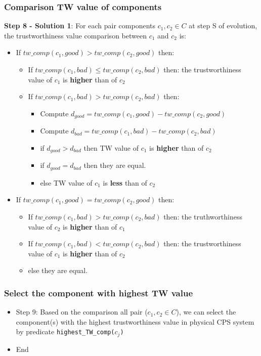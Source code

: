 \documentclass{beamer}
\begin{document}
\begin{frame}[fragile]
	\frametitle{Comparison TW value of components}
		{\bf Step 8 - Solution 1}: For each pair components $c_1, c_2 \in C$ at step S of evolution, the trustworthiness value comparison between $c_1$ and $c_2$ is:
		\begin{itemize}
			\item If $tw\_comp(c_1,good) > tw\_comp(c_2,good)$ then:
			\begin{itemize}
				\item If $tw\_comp(c_1,bad) \leq tw\_comp(c_2,bad)$ then: the trustworthiness value of $c_1$ is {\bf higher} than of $c_2$
				\item If $tw\_comp(c_1,bad) > tw\_comp(c_2,bad)$ then:
				\begin{itemize}
					\item Compute $d_{good} = tw\_comp(c_1,good) - tw\_comp(c_2,good)$
					\item Compute $d_{bad} = tw\_comp(c_1,bad) - tw\_comp(c_2,bad)$
					\item if $d_{good} > d_{bad}$ then TW value of $c_1$ is {\bf higher} than of $c_2$
					\item if $d_{good} = d_{bad}$ then they are equal.
					\item else TW value of $c_1$ is {\bf less} than of $c_2$
				\end{itemize}		
			\end{itemize}
			\item If $tw\_comp(c_1,good) = tw\_comp(c_2,good)$ then:
			\begin{itemize}
				\item If $tw\_comp(c_1,bad) > tw\_comp(c_2,bad)$ then: the truthworthiness value of $c_2$ is {\bf higher} than of $c_1$
				\item If $tw\_comp(c_1,bad) < tw\_comp(c_2,bad)$ then: the trustworthiness value of $c_1$ is {\bf higher} than of $c_2$ 	
				\item else they are equal.
			\end{itemize}
		\end{itemize}
\end{frame}


\begin{frame}[fragile]
	\frametitle{Select the component with highest TW value}
	\begin{itemize}
		\item Step 9: Based on the comparison all pair ($c_1, c_2 \in C$), we can select the component(s) with the highest trustworthiness value in physical CPS system by predicate {\tt highest\_TW\_comp($c_j$)}
		\item End
	\end{itemize}
	
\end{frame}
\end{document}
